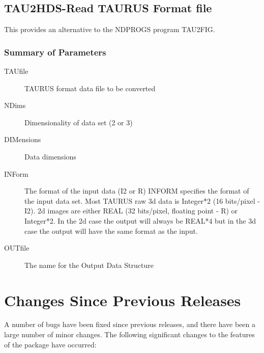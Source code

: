\subsection{TAU2HDS-Read TAURUS Format file}

This provides an alternative to the NDPROGS program TAU2FIG.

\subsubsection{Summary of Parameters}

\begin{description}
\item[TAUfile] TAURUS format data file to be converted
\item[NDims] Dimensionality of data set (2 or 3)
\item[DIMensions] Data dimensions
\item[INForm] The format of the input data (I2 or R)
INFORM specifies the format of the input data set.
Most TAURUS raw 3d data is Integer*2 (16 bits/pixel - I2).
2d images are  either REAL (32 bits/pixel, floating point - R) or
Integer*2.
In the 2d case the output will always be REAL*4 but in the 3d case the
output will have the same format as the input.
\item[OUTfile] The name for the Output Data Structure
\end{description}

\section{Changes Since Previous Releases}

A number of bugs have been fixed since previous releases, and there have
been a large number of minor changes.
The following significant changes to the features of the package have occurred:

